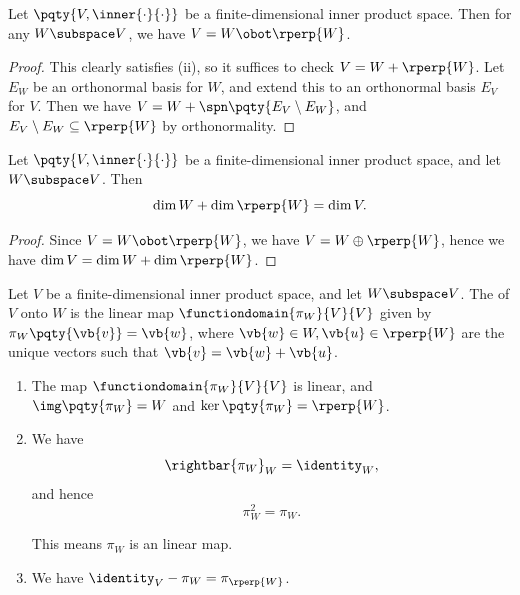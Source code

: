 \begin{lemma}
    Let \(\pqty{V, \inner{\cdot}{\cdot}}\) be a finite-dimensional inner product space. Then for any \(W \subspace V\), we have \(V = W \obot \rperp{W}\).
\end{lemma}

\begin{proof}
    This clearly satisfies (ii), so it suffices to check \(V = W + \rperp{W}\). Let \(E_W\) be an orthonormal basis for \(W\), and extend this to an orthonormal basis \(E_V\) for \(V\). Then we have \(V = W + \spn \pqty{E_V \setminus E_W}\), and \(E_V \setminus E_W \subseteq \rperp{W}\) by orthonormality.
\end{proof}

\begin{corollary}
    Let \(\pqty{V, \inner{\cdot}{\cdot}}\) be a finite-dimensional inner product space, and let \(W \subspace V\). Then
    \[
        \dim W + \dim \rperp{W} = \dim V.
    \]
\end{corollary}

\begin{proof}
    Since \(V = W \obot \rperp{W}\), we have \(V = W \oplus \rperp{W}\), hence we have \(\dim V = \dim W + \dim \rperp{W}\).
\end{proof}

\begin{definition}
    Let \(V\) be a finite-dimensional inner product space, and let \(W \subspace V\). The  of \(V\) onto \(W\) is the linear map \(\functiondomain{\pi_W}{V}{V}\) given by \(\pi_W \pqty{\vb{v}} = \vb{w}\), where \(\vb{w} \in W, \vb{u} \in \rperp{W}\) are the unique vectors such that \(\vb{v} = \vb{w} + \vb{u}\).
\end{definition}

\begin{remarks}
    \begin{enumerate}[label=(\roman*)]
        \item The map \(\functiondomain{\pi_W}{V}{V}\) is linear, and \(\img \pqty{\pi_W} = W\) and \(\ker \pqty{\pi_W} = \rperp{W}\).
        \item We have
        \[
            \rightbar{\pi_W}_{W} = \identity_W,
        \]
        and hence
        \[
            \pi_W^2 = \pi_W.
        \]

        This means \(\pi_W\) is an  linear map.

        \item We have \(\identity_V - \pi_W = \pi_{\rperp{W}}\).
    \end{enumerate}
\end{remarks}

